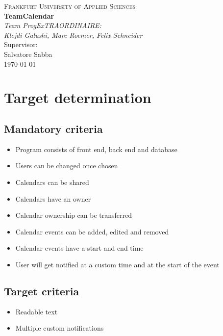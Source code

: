 \documentclass[]{article}
\begin{document}
	\begin{titlepage}
		\centering
		\vspace*{0cm}
		{\scshape\Large Frankfurt University of Applied Sciences}\\[3cm]
		{\huge\bfseries TeamCalendar}\\[8cm]
		{\Large\itshape Team ProgExTRAORDINAIRE:}\\
		{\Large\itshape Klejdi Galushi, Marc Roemer, Felix Schneider}\\[3cm]
		Supervisor:\\
		Salvatore Sabba\\[1cm]
		{\large \today}
	\end{titlepage}
	\newpage
	\begin{spacing}{0.95}
		\tableofcontents
	\end{spacing}
	\newpage
	
\section{Target determination}
	\subsection{Mandatory criteria}
		\begin{itemize}
			\item Program consists of front end, back end and database
			\item Users can be changed once chosen
			\item Calendars can be shared
			\item Calendars have an owner
			\item Calendar ownership can be transferred
			\item Calendar events can be added, edited and removed
			\item Calendar events have a start and end time
			\item User will get notified at a custom time and at the start of the event
		\end{itemize}
	\subsection{Target criteria}
		\begin{itemize}
			\item Readable text
			\item Multiple custom notifications
		\end{itemize}
\end{document}
